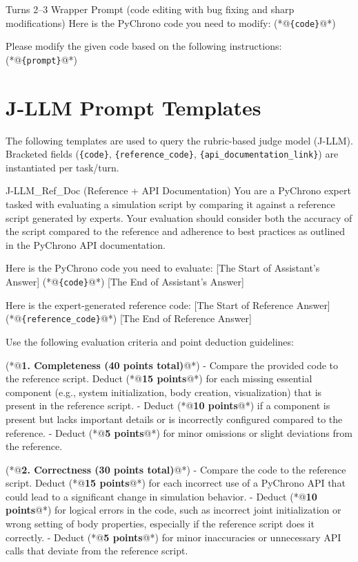 \documentclass{ieeeaccess}
\begin{document}
\begin{appendices}
\begin{PromptBlock}{Turns 2--3 Wrapper Prompt (code editing with bug fixing and sharp modifications)}
Here is the PyChrono code you need to modify:
(*@\texttt{\{code\}}@*)

Please modify the given code based on the following instructions:
(*@\texttt{\{prompt\}}@*)
\end{PromptBlock}


\section{J-LLM Prompt Templates}
\label{app:jllm_prompts}

\noindent The following templates are used to query the rubric-based judge model (J-LLM). 
Bracketed fields (\texttt{\{code\}}, \texttt{\{reference\_code\}}, \texttt{\{api\_documentation\_link\}}) are instantiated per task/turn.

\begin{PromptBlock}{J-LLM\_Ref\_Doc (Reference + API Documentation)}
You are a PyChrono expert tasked with evaluating a simulation script by comparing it against a reference script generated by experts. Your evaluation should consider both the accuracy of the script compared to the reference and adherence to best practices as outlined in the PyChrono API documentation.

Here is the PyChrono code you need to evaluate:
[The Start of Assistant's Answer]
(*@\texttt{\{code\}}@*)
[The End of Assistant's Answer]

Here is the expert-generated reference code:
[The Start of Reference Answer]
(*@\texttt{\{reference\_code\}}@*)
[The End of Reference Answer]

Use the following evaluation criteria and point deduction guidelines:

(*@\textbf{1. Completeness (40 points total)}@*)
- Compare the provided code to the reference script. Deduct (*@\textbf{15 points}@*) for each missing essential component (e.g., system initialization, body creation, visualization) that is present in the reference script.
- Deduct (*@\textbf{10 points}@*) if a component is present but lacks important details or is incorrectly configured compared to the reference.
- Deduct (*@\textbf{5 points}@*) for minor omissions or slight deviations from the reference.

(*@\textbf{2. Correctness (30 points total)}@*)
- Compare the code to the reference script. Deduct (*@\textbf{15 points}@*) for each incorrect use of a PyChrono API that could lead to a significant change in simulation behavior.
- Deduct (*@\textbf{10 points}@*) for logical errors in the code, such as incorrect joint initialization or wrong setting of body properties, especially if the reference script does it correctly.
- Deduct (*@\textbf{5 points}@*) for minor inaccuracies or unnecessary API calls that deviate from the reference script.


\end{PromptBlock}
\end{appendices}
\end{document}
